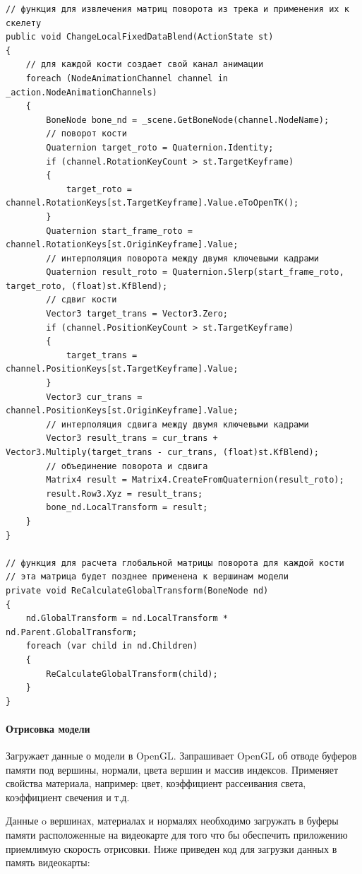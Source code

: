 \begin{verbatim}
// функция для извлечения матриц поворота из трека и применения их к скелету
public void ChangeLocalFixedDataBlend(ActionState st)
{
    // для каждой кости создает свой канал анимации    
    foreach (NodeAnimationChannel channel in _action.NodeAnimationChannels)
    {
        BoneNode bone_nd = _scene.GetBoneNode(channel.NodeName);
        // поворот кости
        Quaternion target_roto = Quaternion.Identity;
        if (channel.RotationKeyCount > st.TargetKeyframe)
        {
            target_roto = channel.RotationKeys[st.TargetKeyframe].Value.eToOpenTK();
        }
        Quaternion start_frame_roto = channel.RotationKeys[st.OriginKeyframe].Value;
        // интерполяция поворота между двумя ключевыми кадрами
        Quaternion result_roto = Quaternion.Slerp(start_frame_roto, target_roto, (float)st.KfBlend);
        // сдвиг кости
        Vector3 target_trans = Vector3.Zero;
        if (channel.PositionKeyCount > st.TargetKeyframe)
        {
            target_trans = channel.PositionKeys[st.TargetKeyframe].Value;
        }
        Vector3 cur_trans = channel.PositionKeys[st.OriginKeyframe].Value;
        // интерполяция сдвига между двумя ключевыми кадрами
        Vector3 result_trans = cur_trans + Vector3.Multiply(target_trans - cur_trans, (float)st.KfBlend);
        // объединение поворота и сдвига
        Matrix4 result = Matrix4.CreateFromQuaternion(result_roto);
        result.Row3.Xyz = result_trans;
        bone_nd.LocalTransform = result;
    }
}

// функция для расчета глобальной матрицы поворота для каждой кости
// эта матрица будет позднее применена к вершинам модели
private void ReCalculateGlobalTransform(BoneNode nd)
{
    nd.GlobalTransform = nd.LocalTransform * nd.Parent.GlobalTransform;
    foreach (var child in nd.Children)
    {
        ReCalculateGlobalTransform(child);
    }
}
\end{verbatim}



\paragraph{Отрисовка модели}
Загружает данные о модели в OpenGL.
Запрашивает OpenGL об отводе буферов памяти под вершины, нормали, цвета вершин и массив индексов. Применяет свойства материала, например: цвет, коэффициент рассеивания света, коэффициент свечения и т.д.

Данные o вершинах, материалах и нормалях необходимо загружать в буферы памяти расположенные на видеокарте для того что бы обеспечить приложению приемлимую скорость отрисовки.
Ниже приведен код для загрузки данных в память видеокарты:

